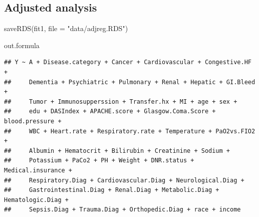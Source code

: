 \documentclass[
]{book}
\newenvironment{Shaded}{\begin{snugshade}}{\end{snugshade}}
\newcommand{\AttributeTok}[1]{\textcolor[rgb]{0.77,0.63,0.00}{#1}}
\newcommand{\CommentTok}[1]{\textcolor[rgb]{0.56,0.35,0.01}{\textit{#1}}}
\newcommand{\DecValTok}[1]{\textcolor[rgb]{0.00,0.00,0.81}{#1}}
\newcommand{\FunctionTok}[1]{\textcolor[rgb]{0.00,0.00,0.00}{#1}}
\newcommand{\NormalTok}[1]{#1}
\newcommand{\OtherTok}[1]{\textcolor[rgb]{0.56,0.35,0.01}{#1}}
\newcommand{\SpecialCharTok}[1]{\textcolor[rgb]{0.00,0.00,0.00}{#1}}
\newcommand{\StringTok}[1]{\textcolor[rgb]{0.31,0.60,0.02}{#1}}
\begin{document}
\hypertarget{adjusted-analysis}{%
\subsection{Adjusted analysis}\label{adjusted-analysis}}

\begin{Shaded}
\end{Shaded}

\begin{Shaded}
\begin{Highlighting}[]
\FunctionTok{saveRDS}\NormalTok{(fit1, }\AttributeTok{file =} \StringTok{"data/adjreg.RDS"}\NormalTok{)}
\end{Highlighting}
\end{Shaded}

\begin{Shaded}
\begin{Highlighting}[]
\NormalTok{out.formula}
\end{Highlighting}
\end{Shaded}

\begin{verbatim}
## Y ~ A + Disease.category + Cancer + Cardiovascular + Congestive.HF + 
##     Dementia + Psychiatric + Pulmonary + Renal + Hepatic + GI.Bleed + 
##     Tumor + Immunosupperssion + Transfer.hx + MI + age + sex + 
##     edu + DASIndex + APACHE.score + Glasgow.Coma.Score + blood.pressure + 
##     WBC + Heart.rate + Respiratory.rate + Temperature + PaO2vs.FIO2 + 
##     Albumin + Hematocrit + Bilirubin + Creatinine + Sodium + 
##     Potassium + PaCo2 + PH + Weight + DNR.status + Medical.insurance + 
##     Respiratory.Diag + Cardiovascular.Diag + Neurological.Diag + 
##     Gastrointestinal.Diag + Renal.Diag + Metabolic.Diag + Hematologic.Diag + 
##     Sepsis.Diag + Trauma.Diag + Orthopedic.Diag + race + income
\end{verbatim}
\end{document}
